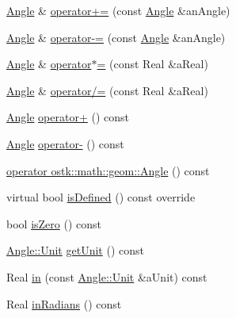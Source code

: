 \begin{DoxyCompactItemize}
\item 
\hyperlink{classostk_1_1physics_1_1units_1_1_angle}{Angle} \& \hyperlink{classostk_1_1physics_1_1units_1_1_angle_a814933d09dc8cb6cb4a7a013386c2267}{operator+=} (const \hyperlink{classostk_1_1physics_1_1units_1_1_angle}{Angle} \&an\+Angle)
\item 
\hyperlink{classostk_1_1physics_1_1units_1_1_angle}{Angle} \& \hyperlink{classostk_1_1physics_1_1units_1_1_angle_ac7699382075d4997670ed0071f8ba540}{operator-\/=} (const \hyperlink{classostk_1_1physics_1_1units_1_1_angle}{Angle} \&an\+Angle)
\item 
\hyperlink{classostk_1_1physics_1_1units_1_1_angle}{Angle} \& \hyperlink{classostk_1_1physics_1_1units_1_1_angle_aba01c2eb2166f1be5c5ff8d5b2cb6363}{operator$\ast$=} (const Real \&a\+Real)
\item 
\hyperlink{classostk_1_1physics_1_1units_1_1_angle}{Angle} \& \hyperlink{classostk_1_1physics_1_1units_1_1_angle_aaa0ad11b6d769a44c3a5bcef2bad8b6a}{operator/=} (const Real \&a\+Real)
\item 
\hyperlink{classostk_1_1physics_1_1units_1_1_angle}{Angle} \hyperlink{classostk_1_1physics_1_1units_1_1_angle_a99e2fafc9060fa99b1fb4623f6ed8f65}{operator+} () const
\item 
\hyperlink{classostk_1_1physics_1_1units_1_1_angle}{Angle} \hyperlink{classostk_1_1physics_1_1units_1_1_angle_aa1453072b55bf475b8953cf1dc5bdda3}{operator-\/} () const
\item 
\hyperlink{classostk_1_1physics_1_1units_1_1_angle_ae92c124ae780a2c61747f343a6b3f773}{operator ostk\+::math\+::geom\+::\+Angle} () const
\item 
virtual bool \hyperlink{classostk_1_1physics_1_1units_1_1_angle_a912562d12513b2fcee56262208206b62}{is\+Defined} () const override
\item 
bool \hyperlink{classostk_1_1physics_1_1units_1_1_angle_afae7328cb579939eaaf8c631ac93e3ba}{is\+Zero} () const
\item 
\hyperlink{classostk_1_1physics_1_1units_1_1_angle_aea1f8018b1d378b9dee56959d8eb9def}{Angle\+::\+Unit} \hyperlink{classostk_1_1physics_1_1units_1_1_angle_abe7e90d80d24d15464a6041569196ea3}{get\+Unit} () const
\item 
Real \hyperlink{classostk_1_1physics_1_1units_1_1_angle_a80e7aa75986fc9b4644b6d0db4f3ba9c}{in} (const \hyperlink{classostk_1_1physics_1_1units_1_1_angle_aea1f8018b1d378b9dee56959d8eb9def}{Angle\+::\+Unit} \&a\+Unit) const
\item 
Real \hyperlink{classostk_1_1physics_1_1units_1_1_angle_a732c6410b7eae97dadec4c9151c86e3b}{in\+Radians} () const

\end{DoxyCompactItemize}
